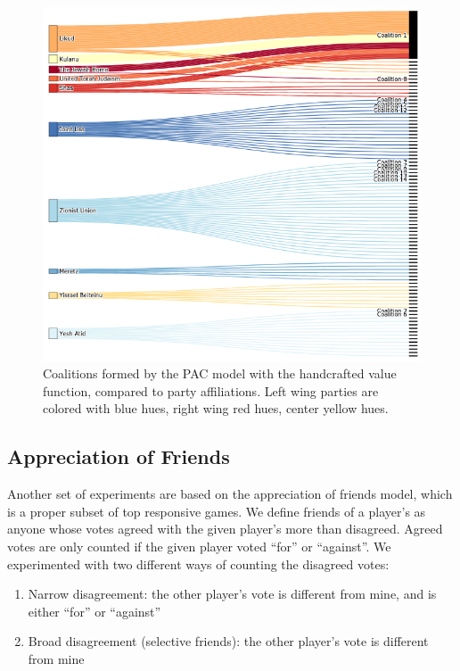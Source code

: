 \documentclass[letterpaper]{article} %
\begin{document}
\begin{figure}[htb]
\includegraphics[width=\columnwidth]{pac_value_function}
\caption{Coalitions formed by the PAC model with the handcrafted value function, compared to party affiliations. Left wing parties are colored with blue hues, right wing red hues, center yellow hues.}
\end{figure}

\subsection{Appreciation of Friends}
Another set of experiments are based on the appreciation of friends model, which is a proper subset of top responsive games. We define friends of a player's as anyone whose votes agreed with the given player's more than disagreed. Agreed votes are only counted if the given player voted ``for'' or ``against''. We experimented with two different ways of counting the disagreed votes:

\begin{enumerate}
  \item Narrow disagreement: the other player's vote is different from mine, and is either ``for'' or ``against''
  \item Broad disagreement (selective friends): the other player's vote is different from mine
\end{enumerate}
\end{document}
